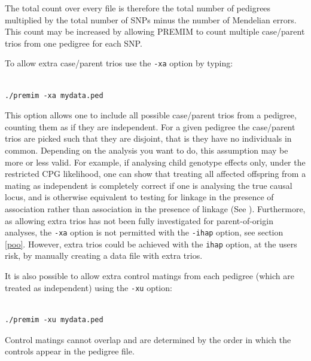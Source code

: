\documentclass[a4paper,12pt]{article}
\newcommand{\code}[1]{{\footnotesize{{\tt #1}}}}
\begin{document}
The total count over every file is therefore the total number of pedigrees multiplied by the total number of SNPs minus the number of Mendelian errors. This count may be increased by allowing PREMIM to count multiple case/parent trios from one pedigree for each SNP. 

To allow extra case/parent trios use the \code{-xa} option by typing: 
\vspace{0.35cm} \begin{lstlisting}

./premim -xa mydata.ped

\end{lstlisting} \vspace{0.35cm}
This option allows one to include all possible case/parent trios from a pedigree, counting them as if they are independent. For a given pedigree the case/parent trios are picked such that they are disjoint, that is they have no individuals in common. Depending on the analysis you want to do, this assumption may be more or less valid. For example, if analysing child genotype effects only, under the restricted CPG likelihood, one can show that treating all affected offspring from a mating as independent is completely correct if one is analysing the true causal locus, and is otherwise equivalent to testing for linkage in the presence of association rather than association in the presence of linkage (See \citet{cordell:04}). Furthermore, as allowing extra trios has not been fully investigated for parent-of-origin analyses, the \code{-xa} option is not permitted with the \code{-ihap} option, see  section \ref{poo}. However, extra trios could be achieved with the \code{ihap} option, at the users risk, by manually creating a data file with extra trios. 

It is also possible to allow extra control matings from each pedigree (which are treated as independent) using the \code{-xu} option: 
\vspace{0.35cm} \begin{lstlisting}

./premim -xu mydata.ped

\end{lstlisting} \vspace{0.35cm}
Control matings cannot overlap and are determined by the order in which the controls appear in the pedigree file. 

\end{document}

